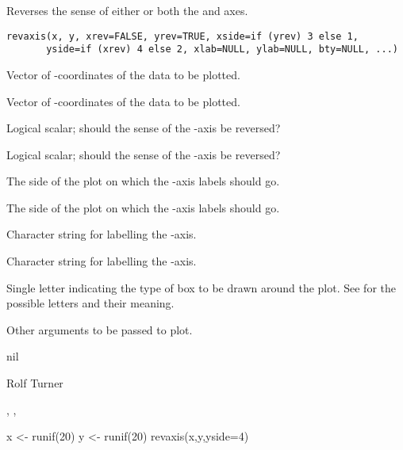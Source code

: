 \begin{Description}\relax
Reverses the sense of either or both the  and  axes.
\end{Description}
\begin{Usage}
\begin{verbatim}
revaxis(x, y, xrev=FALSE, yrev=TRUE, xside=if (yrev) 3 else 1,
       yside=if (xrev) 4 else 2, xlab=NULL, ylab=NULL, bty=NULL, ...)

\end{verbatim}
\end{Usage}
\begin{Arguments}
\begin{ldescription}
\item[\code{x}] Vector of -coordinates of the data to be plotted. 
\item[\code{y}] Vector of -coordinates of the data to be plotted. 
\item[\code{xrev}] Logical scalar; should the sense of the -axis
be reversed?
\item[\code{yrev}] Logical scalar; should the sense of the -axis
be reversed?
\item[\code{xside}] The side of the plot on which the -axis labels
should go.
\item[\code{yside}] The side of the plot on which the -axis labels
should go.
\item[\code{xlab}] Character string for labelling the -axis. 
\item[\code{ylab}] Character string for labelling the -axis. 
\item[\code{bty}] Single letter indicating the type of box to be drawn
around the plot. See  for the possible letters
and their meaning.
\item[\code{...}] Other arguments to be passed to plot.
\end{ldescription}
\end{Arguments}
\begin{Value}
nil
\end{Value}
\begin{Author}\relax
Rolf Turner
\end{Author}
\begin{SeeAlso}\relax
{}, , 
\end{SeeAlso}
\begin{Examples}
\begin{ExampleCode}
x <- runif(20)
y <- runif(20)
revaxis(x,y,yside=4)
\end{ExampleCode}
\end{Examples}

